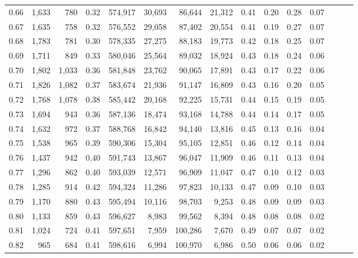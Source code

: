 \begin{tabular}{rrrrrrrrrrrrrrr}
0.66 &   1,633 &    780 &  0.32 &  574,917 &   30,693 &   86,644 &   21,312 &  0.41 &  0.20 &  0.28 &      0.07 \\
0.67 &   1,635 &    758 &  0.32 &  576,552 &   29,058 &   87,402 &   20,554 &  0.41 &  0.19 &  0.27 &      0.07 \\
0.68 &   1,783 &    781 &  0.30 &  578,335 &   27,275 &   88,183 &   19,773 &  0.42 &  0.18 &  0.25 &      0.07 \\
0.69 &   1,711 &    849 &  0.33 &  580,046 &   25,564 &   89,032 &   18,924 &  0.43 &  0.18 &  0.24 &      0.06 \\
0.70 &   1,802 &  1,033 &  0.36 &  581,848 &   23,762 &   90,065 &   17,891 &  0.43 &  0.17 &  0.22 &      0.06 \\
0.71 &   1,826 &  1,082 &  0.37 &  583,674 &   21,936 &   91,147 &   16,809 &  0.43 &  0.16 &  0.20 &      0.05 \\
0.72 &   1,768 &  1,078 &  0.38 &  585,442 &   20,168 &   92,225 &   15,731 &  0.44 &  0.15 &  0.19 &      0.05 \\
0.73 &   1,694 &    943 &  0.36 &  587,136 &   18,474 &   93,168 &   14,788 &  0.44 &  0.14 &  0.17 &      0.05 \\
0.74 &   1,632 &    972 &  0.37 &  588,768 &   16,842 &   94,140 &   13,816 &  0.45 &  0.13 &  0.16 &      0.04 \\
0.75 &   1,538 &    965 &  0.39 &  590,306 &   15,304 &   95,105 &   12,851 &  0.46 &  0.12 &  0.14 &      0.04 \\
0.76 &   1,437 &    942 &  0.40 &  591,743 &   13,867 &   96,047 &   11,909 &  0.46 &  0.11 &  0.13 &      0.04 \\
0.77 &   1,296 &    862 &  0.40 &  593,039 &   12,571 &   96,909 &   11,047 &  0.47 &  0.10 &  0.12 &      0.03 \\
0.78 &   1,285 &    914 &  0.42 &  594,324 &   11,286 &   97,823 &   10,133 &  0.47 &  0.09 &  0.10 &      0.03 \\
0.79 &   1,170 &    880 &  0.43 &  595,494 &   10,116 &   98,703 &    9,253 &  0.48 &  0.09 &  0.09 &      0.03 \\
0.80 &   1,133 &    859 &  0.43 &  596,627 &    8,983 &   99,562 &    8,394 &  0.48 &  0.08 &  0.08 &      0.02 \\
0.81 &   1,024 &    724 &  0.41 &  597,651 &    7,959 &  100,286 &    7,670 &  0.49 &  0.07 &  0.07 &      0.02 \\
0.82 &     965 &    684 &  0.41 &  598,616 &    6,994 &  100,970 &    6,986 &  0.50 &  0.06 &  0.06 &      0.02 \\

\end{tabular}
